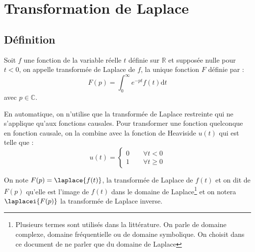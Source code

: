 \chapter{Transformation de Laplace\label{annexe-lap}}
\section{Définition} 
Soit $f$ une fonction de la variable réelle $t$ définie sur $\mathbb{R}$ 
et supposée  nulle pour $t<0$, on appelle transformée de Laplace de $f$, 
la unique fonction $F$ définie par :
\[
F(p) = \int_0^\infty e^{-pt} f(t) \mathrm{d}t
\]
avec $p\in\mathbb{C}$. 

En automatique, on n'utilise que la transformée de Laplace restreinte qui 
ne s'applique qu'aux fonctions causales.
Pour transformer une fonction quelconque en fonction causale, 
on la combine avec la fonction de Heaviside $u(t)$ qui est telle que :
\[
    u(t)=\begin{cases}0\qquad\forall t<0\\1 \qquad\forall t\geq 0\end{cases}
\]

On note $F(p)=\laplace{f(t)}$, la transformée de Laplace de $f(t)$ et on dit 
de $F(p)$ qu'elle est l'image de $f(t)$ dans le domaine de 
Laplace\footnote{Plusieurs termes sont utilisés dans la littérature. On parle 
de domaine complexe, domaine fréquentielle ou de domaine symbolique. On choisit 
dans ce document de ne parler que du domaine de Laplace} et on notera 
$\laplacei{F(p)}$ la transformée de Laplace inverse.
